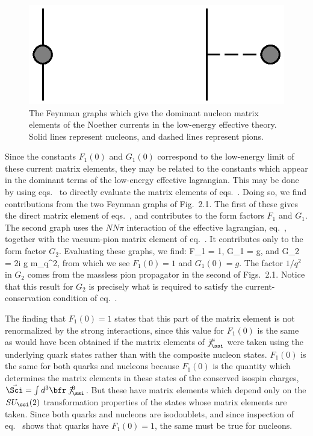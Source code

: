 \documentclass[12pt]{report}
\begin{document}
\begin{figure}
\includegraphics{NME.eps}
\caption{The Feynman graphs which give the dominant nucleon
matrix elements of the Noether currents in the low-energy
effective theory. Solid lines represent nucleons, and
dashed lines represent pions.}
\end{figure}


Since the constants $F_1(0)$ and $G_1(0)$ correspond to the
low-energy limit of these current matrix elements, they may
be related to the constants which appear in the dominant
terms of the low-energy effective lagrangian. This may be
done by using 
eqs.~ to directly evaluate the matrix
elements of eqs.~. Doing so, we
find contributions from the two Feynman graphs of Fig.~2.1.
The first of these gives the direct matrix element of
eqs.~, and contributes to the form
factors $F_1$ and $G_1$. The second graph uses the $NN\pi$
interaction of the effective lagrangian,
eq.~, together with the vacuum-pion
matrix element of eq.~. It
contributes only to the form factor $G_2$. Evaluating these
graphs, we find:
%
\eq
\label{formfactorpredictions}
F_1 = 1, \qquad G_1 = g, \qquad \hbox{and} 
\qquad G_2 = {2i g  m_\ssn \over q^2},
\eeq
%
from which we see $F_1(0) = 1$ and $G_1(0) = g$. The factor
$1/q^2$ in $G_2$ comes from the massless pion propagator in
the second of Figs.~2.1. Notice that this result for $G_2$
is precisely what is required to satisfy the
current-conservation condition of
eq.~.

The finding that $F_1(0) = 1$ states that this part of the
matrix element is not renormalized by the strong
interactions, since this value for $F_1(0)$ is the same as
would have been obtained if the matrix elements of
$\vec\jmath^\mu_\ssi$ were taken using the underlying quark
states rather than with the composite nucleon states.
$F_1(0)$ is the same for both quarks and nucleons because
$F_1(0)$ is the quantity which determines the matrix
elements in these states of the conserved isospin charges,
$\vec \Sci = \int 
d^3\bfr \; \vec\jmath^0_\ssi$. But these have matrix
elements which depend only on the $SU_\ssi(2)$
transformation properties of the states whose matrix
elements are taken. Since both quarks and nucleons are
isodoublets, and since inspection of 
eq.~ shows that quarks have $F_1(0) =
1$, the same must be true for nucleons.
\end{document}
